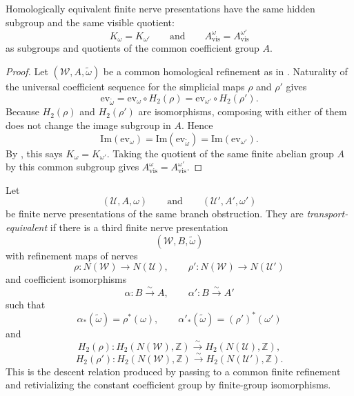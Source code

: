 \begin{theorem}\label{thm:visible-quotient-presentation-invariance}
Homologically equivalent finite nerve presentations have the same hidden
subgroup and the same visible quotient:
\[
K_{\omega}=K_{\omega'}
\qquad\text{and}\qquad
A_{\mathrm{vis}}^{\omega}=A_{\mathrm{vis}}^{\omega'}
\]
as subgroups and quotients of the common coefficient group $A$.
\end{theorem}

\begin{proof}
Let $(\mathcal W,A,\widetilde\omega)$ be a common homological refinement as in
. Naturality of the
universal coefficient sequence for the simplicial maps $\rho$ and $\rho'$ gives
\[
\mathrm{ev}_{\widetilde\omega}
=
\mathrm{ev}_{\omega}\circ H_2(\rho)
=
\mathrm{ev}_{\omega'}\circ H_2(\rho').
\]
Because $H_2(\rho)$ and $H_2(\rho')$ are isomorphisms, composing with either of
them does not change the image subgroup in $A$. Hence
\[
\mathrm{Im}(\mathrm{ev}_{\omega})
=
\mathrm{Im}(\mathrm{ev}_{\widetilde\omega})
=
\mathrm{Im}(\mathrm{ev}_{\omega'}).
\]
By , this says
$K_{\omega}=K_{\omega'}$. Taking the quotient of the same finite abelian group
$A$ by this common subgroup gives
$A_{\mathrm{vis}}^{\omega}=A_{\mathrm{vis}}^{\omega'}$.
\end{proof}

\begin{definition}\label{def:transport-equivalent-finite-presentations}
Let
\[
(\mathcal U,A,\omega)
\qquad\text{and}\qquad
(\mathcal U',A',\omega')
\]
be finite nerve presentations of the same branch obstruction. They are
\emph{transport-equivalent} if there is a third finite nerve presentation
\[
(\mathcal W,B,\widetilde\omega)
\]
with refinement maps of nerves
\[
\rho:N(\mathcal W)\longrightarrow N(\mathcal U),
\qquad
\rho':N(\mathcal W)\longrightarrow N(\mathcal U')
\]
and coefficient isomorphisms
\[
\alpha:B\xrightarrow{\sim} A,
\qquad
\alpha':B\xrightarrow{\sim} A'
\]
such that
\[
\alpha_*(\widetilde\omega)=\rho^*(\omega),
\qquad
\alpha'_*(\widetilde\omega)=(\rho')^*(\omega')
\]
and
\[
H_2(\rho):H_2(N(\mathcal W),\mathbb Z)\xrightarrow{\sim}
H_2(N(\mathcal U),\mathbb Z),
\]
\[
H_2(\rho'):H_2(N(\mathcal W),\mathbb Z)\xrightarrow{\sim}
H_2(N(\mathcal U'),\mathbb Z).
\]
This is the descent relation produced by passing to a common finite refinement
and retivializing the constant coefficient group by finite-group isomorphisms.
\end{definition}


